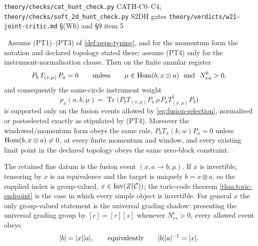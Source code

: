 %
{\texttt{theory/checks/cat\_hunt\_check.py} CATH-C0--C4;
\texttt{theory/checks/soft\_2d\_hunt\_check.py} S2DH gates}%
{\texttt{theory/verdicts/w21-joint-critic.md} \S(W6) and \S9 item 5}

\begin{theorem}\label{thm:fusion-selection}
\statusProvedConditional\ Assume (PT1)--(PT3) of \cref{def:peps-typing}, and
for the momentum form the notation and declared topology stated there; assume
(PT4) only for the instrument-normalisation clause. Then on the finite annular
register
\begin{equation}
  P_b\,T_{(x,\mu)}\,P_a=0
  \qquad\text{unless}\qquad
  \mu\in\operatorname{Hom}(b,x\otimes a)\ \text{ and }\ N_{xa}^{b}>0 ,
  \label{eq:fusion-selection}
\end{equation}
and consequently the same-circle instrument weight
\begin{equation}
  p_x(a,b,\mu)
   =\operatorname{Tr}\bigl(P_bT_{(x,\mu)}P_a\,\rho\,
                           P_aT_{(x,\mu)}^{\dagger}P_b\bigr)
  \label{eq:fusion-weight}
\end{equation}
is supported only on the fusion events allowed by \eqref{eq:fusion-selection},
normalised or postselected exactly as stipulated by (PT4). Moreover the
windowed/momentum form obeys the same rule,
$P_bT_x(k;w)P_a=0$ unless $\operatorname{Hom}(b,x\otimes a)\ne0$, at every finite momentum
and window, and every existing limit point in the declared topology obeys the
same zero-block constraint.

The retained fine datum is the fusion event $(x,a\to b;\mu)$. If $x$ is
invertible, tensoring by $x$ is an equivalence and the target is uniquely
$b=x\otimes a$, so the supplied index is group-valued,
$x\in\operatorname{Inv}(Z(\mathcal{C}))$; the toric-code theorem
\cref{thm:toric-endpoint} is the case in which every simple object is
invertible. For general $x$ the only group-valued statement is the universal
grading shadow: presenting the universal grading group by $[c]=[r][s]$
whenever $N_{rs}^{c}>0$, every allowed event obeys
\begin{equation}
  \lvert b\rvert=\lvert x\rvert\lvert a\rvert,
  \qquad\text{equivalently}\qquad
  \lvert b\rvert\lvert a\rvert^{-1}=\lvert x\rvert.
  \label{eq:grading-shadow}
\end{equation}
\end{theorem}

